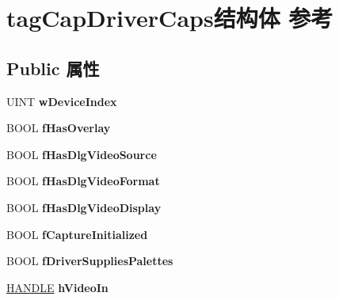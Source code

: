 \hypertarget{structtag_cap_driver_caps}{}\section{tag\+Cap\+Driver\+Caps结构体 参考}
\label{structtag_cap_driver_caps}
\subsection*{Public 属性}
\begin{DoxyCompactItemize}
\item 
\mbox{\label{structtag_cap_driver_caps_a2330c3ab418dd69a8f474592f54c4d27}} 
U\+I\+NT {\bfseries w\+Device\+Index}
\item 
\mbox{\label{structtag_cap_driver_caps_a2f75e7d93d1194bb44c3ef085ed7b951}} 
B\+O\+OL {\bfseries f\+Has\+Overlay}
\item 
\mbox{\label{structtag_cap_driver_caps_abc37459756f79f1b64bbeefa73c6f997}} 
B\+O\+OL {\bfseries f\+Has\+Dlg\+Video\+Source}
\item 
\mbox{\label{structtag_cap_driver_caps_a8a01dee3353676add41c32158bcb6182}} 
B\+O\+OL {\bfseries f\+Has\+Dlg\+Video\+Format}
\item 
\mbox{\label{structtag_cap_driver_caps_a033d124176a14ee9c740d8b667f49377}} 
B\+O\+OL {\bfseries f\+Has\+Dlg\+Video\+Display}
\item 
\mbox{\label{structtag_cap_driver_caps_ae401b25ed23c8412478212f0c0c9fcb6}} 
B\+O\+OL {\bfseries f\+Capture\+Initialized}
\item 
\mbox{\label{structtag_cap_driver_caps_ab34aeebfedfeeb5446ad0c274e6d3f43}} 
B\+O\+OL {\bfseries f\+Driver\+Supplies\+Palettes}
\item 
\mbox{\label{structtag_cap_driver_caps_a1d08aadbb2fe71c2f8d19b6a1953c0a6}} 
\hyperlink{interfacevoid}{H\+A\+N\+D\+LE} {\bfseries h\+Video\+In}
\item 
\mbox{\label{structtag_cap_driver_caps_a9d6b25a05e5402cd3804bfb0c06e7d15}} 

\end{DoxyCompactItemize}
